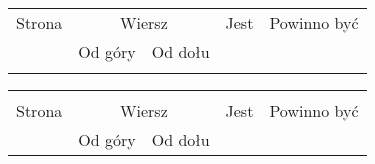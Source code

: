 \documentclass[a4paper,11pt]{article}
\numberwithin{equation}{section}
\begin{document}


















\begin{center}

  \begin{tabular}{|c|c|c|c|c|}
    \hline
    Strona & \multicolumn{2}{c|}{Wiersz} & Jest
                              & Powinno być \\ \cline{2-3}
    & Od góry & Od dołu & & \\
    \hline
           & & & & \\
    \hline
  \end{tabular}





  \begin{tabular}{|c|c|c|c|c|}
    \hline
    & \multicolumn{2}{c|}{} & & \\
    Strona & \multicolumn{2}{c|}{Wiersz} & Jest
                              & Powinno być \\ \cline{2-3}
    & Od góry & Od dołu & & \\
    \hline
    \hline
  \end{tabular}

\end{center}
\end{document}
